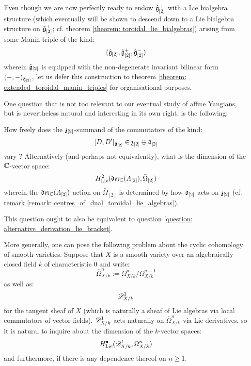         Even though we are now perfectly ready to endow $\hat{\mathfrak{g}}_{[2]}^+$ with a Lie bialgebra structure (which eventually will be shown to descend down to a Lie bialgebra structure on $\tilde{\mathfrak{g}}_{[2]}^+$; cf. theorem \ref{theorem: toroidal_lie_bialgebras}) arising from some Manin triple of the kind:
            $$(\hat{\mathfrak{g}}_{[2]}, \hat{\mathfrak{g}}_{[2]}^+, \hat{\mathfrak{g}}_{[2]}^-)$$
        wherein $\hat{\mathfrak{g}}_{[2]}$ is equipped with the non-degenerate invariant bilinear form $(-, -)_{\hat{\mathfrak{g}}_{[2]}}$, let us defer this construction to theorem \ref{theorem: extended_toroidal_manin_triples} for organisational purposes.

        One question that is not too relevant to our eventual study of affine Yangians, but is nevertheless natural and interesting in its own right, is the following:
        \begin{question} \label{question: uniqueness_of_extended_toroidal_lie_algebras}
            How freely does the $\mathfrak{z}_{[2]}$-summand of the commutators of the kind:
                $$[D, D']_{ \hat{\mathfrak{g}}_{[2]} } \in \mathfrak{z}_{[2]} \oplus \mathfrak{d}_{[2]}$$
            vary ? Alternatively (and perhaps not equivalently), what is the dimension of the $\mathbb{C}$-vector space:
                $$H^2_{\mathrm{Lie}}( \mathfrak{der}_{\mathbb{C}}(A_{[2]}), \bar{\Omega}_{[2]} )$$
            wherein the $\mathfrak{der}_{\mathbb{C}}(A_{[2]})$-action on $\bar{\Omega}_{[2]}$ is determined by how $\mathfrak{d}_{[2]}$ acts on $\mathfrak{z}_{[2]}$ (cf. remark \ref{remark: centres_of_dual_toroidal_lie_algebras}).

            This question ought to also be equivalent to question \ref{question: alternative_derivation_lie_bracket}. 
        \end{question}
        \begin{question}
            More generally, one can pose the following problem about the cyclic cohomology of smooth varieties. Suppose that $X$ is a smooth variety over an algebraically closed field $k$ of characteristic $0$ and write:
                $$\bar{\Omega}_{X/k}^n := \Omega_{X/k}^n/\Omega_{X/k}^{n - 1}$$
            as well as:
                $$\mathscr{D}_{X/k}^1$$
            for the tangent sheaf of $X$ (which is naturally a sheaf of Lie algebras via local commutators of vector fields). $\mathscr{D}_{X/k}^1$ acts naturally on $\bar{\Omega}_{X/k}^n$ via Lie derivatives, so it is natural to inquire about the dimension of the $k$-vector spaces:
                $$H^{\bullet}_{\mathrm{Lie}}( \mathscr{D}_{X/k}^1, \bar{\Omega}_{X/k}^n )$$
            and furthermore, if there is any dependence thereof on $n \geq 1$.  
        \end{question}

